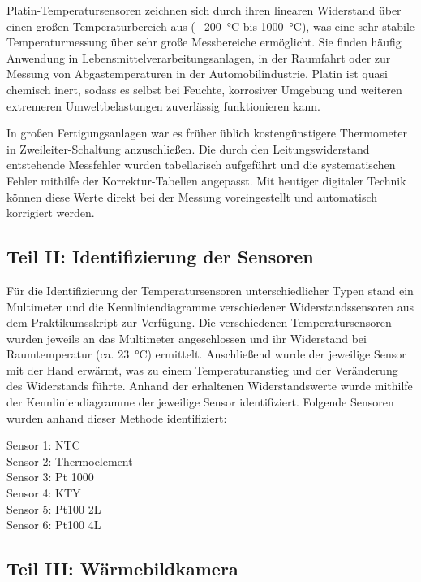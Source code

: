 Platin-Temperatursensoren zeichnen sich durch ihren linearen Widerstand über einen großen Temperaturbereich aus (\SI{-200}{\celsius} bis \SI{1000}{\celsius}), was eine sehr stabile Temperaturmessung über sehr große Messbereiche ermöglicht. Sie finden häufig Anwendung in Lebensmittelverarbeitungsanlagen, in der Raumfahrt oder zur Messung von Abgastemperaturen in der Automobilindustrie. Platin ist quasi chemisch inert, sodass es selbst bei Feuchte, korrosiver Umgebung und weiteren extremeren Umweltbelastungen zuverlässig funktionieren kann. 

In großen Fertigungsanlagen war es früher üblich kostengünstigere Thermometer in Zweileiter-Schaltung anzuschließen. Die durch den Leitungswiderstand entstehende Messfehler wurden tabellarisch aufgeführt und die systematischen Fehler mithilfe der Korrektur-Tabellen angepasst. Mit heutiger digitaler Technik können diese Werte direkt bei der Messung voreingestellt und automatisch korrigiert werden. 

\subsection{Teil II: Identifizierung der Sensoren}

Für die Identifizierung der Temperatursensoren unterschiedlicher Typen stand ein Multimeter und die Kennliniendiagramme verschiedener Widerstandssensoren aus dem Praktikumsskript zur Verfügung. Die verschiedenen Temperatursensoren wurden jeweils an das Multimeter angeschlossen und ihr Widerstand bei Raumtemperatur (ca. \SI{23}{\celsius}) ermittelt. Anschließend wurde der jeweilige Sensor mit der Hand erwärmt, was zu einem Temperaturanstieg und der Veränderung des Widerstands führte. Anhand der erhaltenen Widerstandswerte wurde mithilfe der Kennliniendiagramme der jeweilige Sensor identifiziert. 
Folgende Sensoren wurden anhand dieser Methode identifiziert:

Sensor 1: NTC\\
Sensor 2: Thermoelement\\
Sensor 3: Pt 1000\\
Sensor 4: KTY\\
Sensor 5: Pt100 2L\\
Sensor 6: Pt100 4L\\

\subsection{Teil III: Wärmebildkamera}

